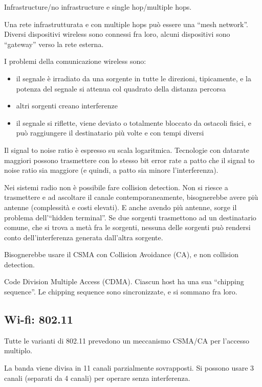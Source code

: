 Infrastructure/no infrastructure e single hop/multiple hops.

Una rete infrastrutturata e con multiple hops pu\`o essere una ``mesh network''. Diversi dispositivi wireless sono connessi fra loro, alcuni dispositivi sono ``gateway'' verso la rete esterna.

I problemi della comunicazione wireless sono:
\begin{itemize}
    \item il segnale \`e irradiato da una sorgente in tutte le direzioni, tipicamente, e la potenza del segnale si attenua col quadrato della distanza percorsa
    \item altri sorgenti creano interferenze
    \item il segnale si riflette, viene deviato o totalmente bloccato da ostacoli fisici, e pu\`o raggiungere il destinatario pi\`u volte e con tempi diversi
\end{itemize}

Il signal to noise ratio \`e espresso su scala logaritmica. Tecnologie con datarate maggiori possono trasmettere con lo stesso bit error rate a patto che il signal to noise ratio sia maggiore (e quindi, a patto sia minore l'interferenza).

Nei sistemi radio non \`e possibile fare collision detection. Non si riesce a trasmettere e ad ascoltare il canale contemporaneamente, bisognerebbe avere pi\`u antenne (complessit\`a e costi elevati). E anche avendo pi\`u antenne, sorge il problema dell'``hidden terminal''. Se due sorgenti trasmettono ad un destinatario comune, che si trova a met\`a fra le sorgenti, nessuna delle sorgenti pu\`o rendersi conto dell'interferenza generata dall'altra sorgente.

Bisognerebbe usare il CSMA con Collision Avoidance (CA), e non collision detection.

Code Division Multiple Access (CDMA). Ciascun host ha una sua ``chipping sequence''. Le chipping sequence sono sincronizzate, e si sommano fra loro. 

\subsection{Wi-fi: 802.11}

Tutte le varianti di 802.11 prevedono un meccanismo CSMA/CA per l'accesso multiplo.

La banda viene divisa in 11 canali parzialmente sovrapposti. Si possono usare 3 canali (separati da 4 canali) per operare senza interferenza.








































